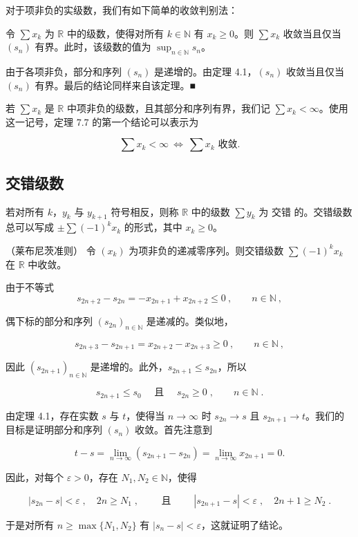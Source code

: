 对于项非负的实级数，我们有如下简单的收敛判别法：

\begin{theorem}

令 $ \sum x_k $ 为 $ \mathbb{R} $ 中的级数，使得对所有 $ k \in \mathbb{N} $ 有 $ x_k \geq 0 $。则 $ \sum x_k $ 收敛当且仅当 $ (s_n) $ 有界。此时，该级数的值为 $ \sup_{n \in \mathbb{N}} s_n $。

\proofhead
由于各项非负，部分和序列 $ (s_{n}) $ 是递增的。由定理 4.1，$ (s_{n}) $ 收敛当且仅当 $ (s_{n}) $ 有界。最后的结论同样来自该定理。■
\end{theorem}

若 $ \sum x_k $ 是 $ \mathbb{R} $ 中项非负的级数，且其部分和序列有界，我们记 $ \sum x_k < \infty $。使用这一记号，定理 7.7 的第一个结论可以表示为

\[
\sum x_{k}<\infty\ \Longleftrightarrow\ \sum x_{k}\text{ 收敛}.
\]

\subsection*{交错级数}

若对所有 $k$，$y_k$ 与 $y_{k+1}$ 符号相反，则称 $ \mathbb{R} $ 中的级数 $\sum y_k$ 为 $\text{交错}$ 的。交错级数总可以写成 $\pm\sum(-1)^k x_k$ 的形式，其中 $x_k \geq 0$。

\begin{theorem}

（莱布尼茨准则） 令 $ (x_k) $ 为项非负的递减零序列。则交错级数 $ \sum(-1)^k x_k $ 在 $ \mathbb{R} $ 中收敛。

\proofhead
由于不等式
\[
s_{2n+2}-s_{2n}=-x_{2n+1}+x_{2n+2}\leq0~,\qquad n\in\mathbb{N}~,
\]

偶下标的部分和序列 $ (s_{2n})_{n\in\mathbb{N}} $ 是递减的。类似地，

\[
s_{2n+3}-s_{2n+1}=x_{2n+2}-x_{2n+3}\ge0~,\qquad n\in\mathbb{N}~,
\]

因此 $ (s_{2n+1})_{n\in\mathbb{N}} $ 是递增的。此外，$ s_{2n+1}\leq s_{2n} $，所以

\[
s_{2n+1}\leq s_{0}\quad\text{ 且 }\quad s_{2n}\geq0\;,\qquad n\in\mathbb{N}\;.
\]

由定理 4.1，存在实数 $s$ 与 $t$，使得当 $n \to \infty$ 时 $s_{2n} \to s$ 且 $s_{2n+1} \to t$。我们的目标是证明部分和序列 $(s_n)$ 收敛。首先注意到

\[
t-s=\lim_{n\to\infty}(s_{2n+1}-s_{2n})=\lim_{n\to\infty}x_{2n+1}=0.
\]

因此，对每个 $ \varepsilon > 0 $，存在 $ N_1, N_2 \in \mathbb{N} $，使得

\[
|s_{2n}-s|<\varepsilon\;,\quad2n\geq N_{1}\;,\qquad\text{ 且 }\qquad|s_{2n+1}-s|<\varepsilon\;,\quad2n+1\geq N_{2}\;.
\]

于是对所有 $ n \geq \max\{N_1, N_2\} $ 有 $ |s_n - s| < \varepsilon $，这就证明了结论。

\end{theorem}

